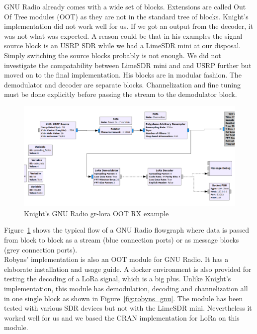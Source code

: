 GNU Radio already comes with a wide set of blocks. Extensions are called Out Of Tree modules (OOT) as they are not in the 
standard tree of blocks. Knight's implementation did not work well for us. If we got an output from the decoder, it was not 
what was expected. A reason could be that in his examples the signal source block is an USRP SDR while we had a LimeSDR mini 
at our disposal. Simply switching the source blocks probably is not enough. We did not investigate the compatability between LimeSDR mini
and and USRP further but moved on to the final implementation.
His blocks are in modular fashion. The demodulator and decoder are separate blocks. Channelization and fine tuning must be done 
explicitly before passing the stream to the demodulator block.

\begin{figure}[h]
    \centering
    \includegraphics[width=1\textwidth]{figures/matt_gnu_example.png}
    \caption{Knight's GNU Radio gr-lora OOT RX example~\cite{knight_implementation}}
    \label{fig:knight_gnu}
\end{figure}

Figure~\ref{fig:knight_gnu} shows the typical flow of a GNU Radio flowgraph where data is passed 
from block to block as a stream (blue connection ports) or as message blocks (grey connection ports).
\\
Robyns' implementation is also an OOT module for GNU Radio. It has a elaborate 
installation and usage guide. A docker environment is also provided for testing the 
decoding of a LoRa signal, which is a big plus. Unlike Knight's implementation, this module
has demodulation, decoding and channelization all in one single block as shown in Figure~\ref{fig:robyns_gnu}. 
The module has been tested with various SDR devices but not with the LimeSDR mini. Nevertheless it worked
well for us and we based the CRAN implementation for LoRa on this module.


